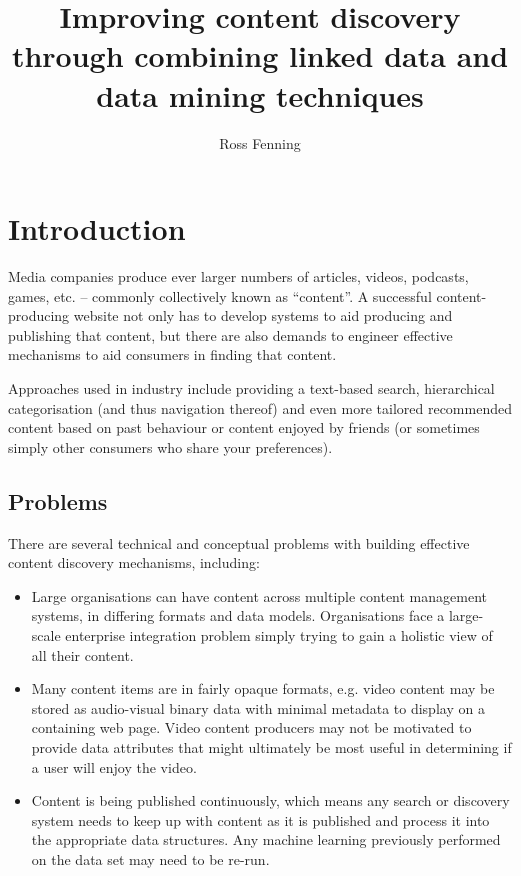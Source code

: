 \documentclass[10pt,a4paper]{report}
\title{Improving content discovery through combining linked data and data mining techniques}
\author{Ross Fenning}
\begin{document}
\maketitle

\chapter{Introduction}

Media companies produce ever larger numbers of articles, videos, podcasts,
games, etc. -- commonly collectively known as ``content''. A successful
content-producing website not only has to develop systems to aid producing and
publishing that content, but there are also demands to engineer effective
mechanisms to aid consumers in finding that content.

Approaches used in industry include providing a text-based search, hierarchical
categorisation (and thus navigation thereof) and even more tailored recommended
content based on past behaviour or content enjoyed by friends (or sometimes
simply other consumers who share your preferences).

\section{Problems}

There are several technical and conceptual problems with building effective
content discovery mechanisms, including:

\begin{itemize}

\item Large organisations can have content across multiple content management
systems, in differing formats and data models. Organisations face a large-scale
enterprise integration problem simply trying to gain a holistic view of all
their content.

\item Many content items are in fairly opaque formats, e.g. video content may be
stored as audio-visual binary data with minimal metadata to display on a
containing web page. Video content producers may not be motivated to provide
data attributes that might ultimately be most useful in determining if a user
will enjoy the video.

\item Content is being published continuously, which means any search or
discovery system needs to keep up with content as it is published and process it
into the appropriate data structures. Any machine learning previously performed
on the data set may need to be re-run.

\end{itemize}
\end{document}
